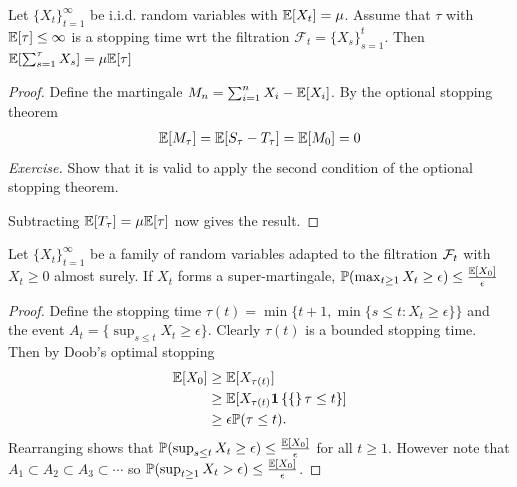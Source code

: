 \begin{theorem}
    Let $\{X_t\}_{t=1}^{\infty}$ be i.i.d. random variables with $\mathbb{E}[X_t] = \mu$. Assume that $\tau$ with $\mathbb{E}[\tau]\leq \infty$ is a stopping time wrt the filtration $\mathcal{F}_{t} = \{X_s\}_{s=1}^t$. Then $\mathbb{E}[\sum_{s=1}^{\tau} X_s] = \mu\mathbb{E}[\tau]$
\end{theorem}
\begin{proof}
    Define the martingale $M_n = \sum_{i=1}^n X_i - \mathbb{E}[X_i]$. By the optional stopping theorem
    \begin{align*}
        \mathbb{E}[M_{\tau}] = \mathbb{E}[S_{\tau} - T_{\tau}] = \mathbb{E}[M_0] = 0
    \end{align*}
    \textit{Exercise.} Show that it is valid to apply the second condition of the optional stopping theorem. 
    
    Subtracting $\mathbb{E}[T_{\tau}] = \mu\mathbb{E}[\tau]$ now gives the result. 
\end{proof}


\begin{theorem}
    Let $\{X_t\}_{t=1}^{\infty}$ be a family of random variables adapted to the filtration $\mathcal{F}_t$ with $X_t\geq 0$ almost surely.  If $X_t$ forms a super-martingale, $\mathbb{P}(\max_{t\geq 1} X_t \geq \epsilon) \leq \frac{\mathbb{E}[X_0]}{\epsilon}$
\end{theorem}
\begin{proof}
    Define the stopping time $\tau(t) = \min\{t+1,\min\{s\leq t: X_t\geq \epsilon\}\}$ and the event $A_t = \{\sup_{s\leq t} X_t \geq \epsilon\}$. Clearly $\tau(t)$ is a bounded stopping time. Then by Doob's optimal stopping
    \begin{align*}
        \E[X_0] 
        &\geq \E[X_{\tau(t)}] \\
        &\geq \E[X_{\tau(t)} \1\{\tau \leq t\}] \\
        &\geq \epsilon \P(\tau \leq t).
        
    \end{align*}
    Rearranging shows that $\mathbb{P}(\sup_{s\leq t} X_t \geq \epsilon) \leq \frac{\mathbb{E}[X_0]}{\epsilon}$ for all $t\geq 1$. However note that $A_1\subset A_2\subset A_3\subset \cdots$ so $\mathbb{P}(\sup_{t\geq 1} X_{t} > \epsilon) \leq \frac{\mathbb{E}[X_0]}{\epsilon}$.
\end{proof}


